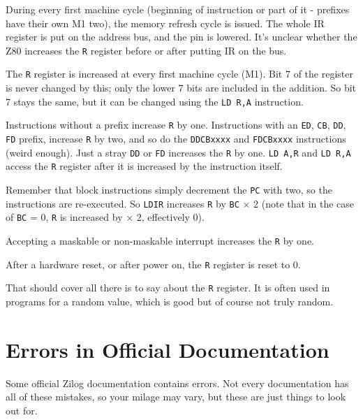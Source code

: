 During every first machine cycle (beginning of instruction or part of it - prefixes have their own M1 two), the memory refresh cycle is issued. The whole IR register is put on the address bus, and the  pin is lowered.  It's unclear whether the Z80 increases the {\tt R} register before or after putting IR on the bus. 

The {\tt R} register is increased at every first machine cycle (M1). Bit 7 of the register is never changed by this; only the lower 7 bits are included in the addition. So bit 7 stays the same, but it can be changed using the
{\tt LD R,A} instruction.

Instructions without a prefix increase {\tt R} by one. Instructions with an {\tt ED}, {\tt CB}, {\tt DD}, {\tt FD} prefix, increase {\tt R} by two, and so do the {\tt DDCBxxxx} and {\tt FDCBxxxx} instructions (weird enough). Just a stray {\tt DD} or {\tt FD} increases the {\tt R} by one. {\tt LD A,R} and {\tt LD R,A} access the {\tt R} register after it is increased by the instruction itself. 

Remember that block instructions simply decrement the {\tt PC} with two, so the instructions are re-executed. So {\tt LDIR} increases {\tt R} by {\tt BC} $\times$ 2 (note that in the case of {\tt BC} = 0, {\tt R} is increased by  $\times$ 2, effectively 0).

Accepting a maskable or non-maskable interrupt increases the {\tt R} by one.

After a hardware reset, or after power on, the {\tt R} register is reset to 0.

That should cover all there is to say about the {\tt R} register. It is often used in programs for a random value, which is good but of course not truly random.


\pagebreak
\section{Errors in Official Documentation}

Some official Zilog documentation contains errors. Not every documentation has all of these mistakes, so your milage may vary, but these are just things to look out for.

